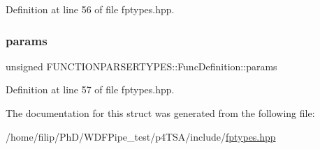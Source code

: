 Definition at line 56 of file fptypes.\+hpp.

\mbox{\label{struct_f_u_n_c_t_i_o_n_p_a_r_s_e_r_t_y_p_e_s_1_1_func_definition_a023b73dfd337217c13d90f6498700094}} 
\subsubsection{\texorpdfstring{params}{params}}
{\footnotesize\ttfamily unsigned F\+U\+N\+C\+T\+I\+O\+N\+P\+A\+R\+S\+E\+R\+T\+Y\+P\+E\+S\+::\+Func\+Definition\+::params}



Definition at line 57 of file fptypes.\+hpp.



The documentation for this struct was generated from the following file\+:\begin{DoxyCompactItemize}
\item 
/home/filip/\+Ph\+D/\+W\+D\+F\+Pipe\+\_\+test/p4\+T\+S\+A/include/\hyperlink{fptypes_8hpp}{fptypes.\+hpp}\end{DoxyCompactItemize}
